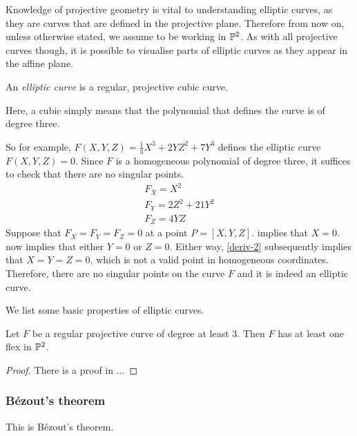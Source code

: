 Knowledge of projective geometry is vital to understanding elliptic curves, as they are curves that are defined in the projective plane.
Therefore from now on, unless otherwise stated, we assume to be working in $\pn[2]$.
As with all projective curves though, it is possible to visualise parts of elliptic curves as they appear in the affine plane.
\begin{definition}
	An \emph{elliptic curve} is a regular, projective cubic curve.
\end{definition}
Here, a cubic simply means that the polynomial that defines the curve is of degree three.

So for example, $F(X,Y,Z) = \frac{1}{3}X^3 + 2YZ^2 + 7Y^3$ defines the elliptic curve $F(X,Y,Z) = 0$.
Since $F$ is a homogeneous polynomial of degree three, it suffices to check that there are no singular points.
\begin{align}
	F_X = X^2 \label{deriv-1}\\
	F_Y = 2Z^2 + 21Y^2 \label{deriv-2}\\
	F_Z = 4YZ \label{deriv-3}
\end{align}
Suppose that $F_X = F_Y = F_Z = 0$ at a point $P = [X,Y,Z]$.
 implies that $X=0$.
 now implies that either $Y=0$ or $Z=0$.
Either way, \cref{deriv-2} subsequently implies that $X = Y = Z = 0$, which is not a valid point in homogeneous coordinates.
Therefore, there are no singular points on the curve $F$ and it is indeed an elliptic curve.

We list some basic properties of elliptic curves.
\begin{theorem}
	Let $F$ be a regular projective curve of degree at least 3.
	Then $F$ has at least one flex in $\pn[2]$.
\end{theorem}
\begin{proof}
	There is a proof in \cite{bix2006}...
\end{proof}
\subsubsection{Bézout's theorem}
This is Bézout's theorem.
